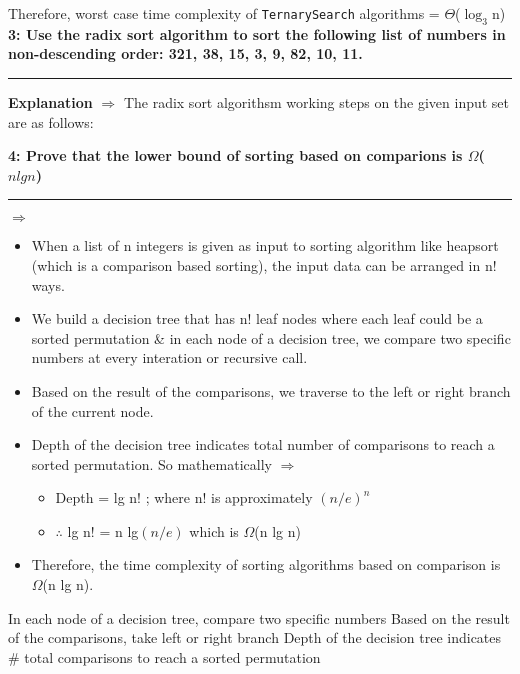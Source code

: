 \documentclass[11pt]{article}
\newcommand\question[3]{\vspace{.25in}\textbf{#1: #2}\vspace{.5em}\hrule\vspace{.10in}}
\renewcommand\part[1]{\vspace{.10in}\textbf{(#1)}}
\begin{document}
Therefore, worst case time complexity of \texttt{TernarySearch} algorithms = $\Theta$($\log_3$n)
\newpage
\question{3} {Use the radix sort algorithm to sort the following list of numbers in non-descending order: 321, 38, 15, 3, 9, 82, 10, 11.}

\part{a} \textbf{Explanation} $\Rightarrow$ The radix sort algorithsm working steps on the given input set are as follows:


\question{4} {Prove that the lower bound of sorting based on comparions is $\Omega$($nlgn$)}

\textbf{Explanation} $\Rightarrow$ 
\begin{itemize}
	\item When a list of n integers is given as input to sorting algorithm like heapsort (which is a comparison based sorting), the input data can be arranged in n! ways.
	\item We build a decision tree that has n! leaf nodes where each leaf could be a sorted permutation \& in each node of a decision tree, we compare two specific numbers at every interation or recursive call.
	\item Based on the result of the comparisons, we traverse to the left or right branch of the current node. 
	\item Depth of the decision tree indicates total number of comparisons to reach a sorted permutation. So mathematically $\Rightarrow$
	\begin{itemize}
		\item Depth = lg n! ; where n! is approximately $(n/e)^n$
		\item $\therefore$ lg n! = n lg$(n/e)$ which is $\Omega$(n lg n)
	\end{itemize}
	\item Therefore, the time complexity of sorting algorithms based on comparison is $\Omega$(n lg n).
\end{itemize}

 
 In each node of a decision tree, compare two specific numbers
 Based on the result of the comparisons, take left or right
branch
 Depth of the decision tree indicates \# total comparisons to
reach a sorted permutation
\end{document}
